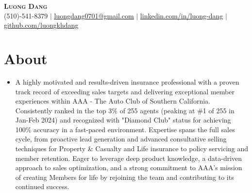 \documentclass[letterpaper,10pt]{article}
\begin{document}
\begin{center}
    \textbf{\Huge \scshape Luong Dang} \\ \vspace{1pt} %
    \small %
    (510)-541-8379 $|$
    \href{mailto:luongdang0701@gmail.com}{\underline{luongdang0701@gmail.com}} $|$
    \href{https://linkedin.com/in/luong-dang}{\underline{linkedin.com/in/luong-dang}} $|$
    \href{https://github.com/luongkhdang}{\underline{github.com/luongkhdang}}
\end{center}

\section{About}
\begin{itemize}[leftmargin=0.15in, label={}, topsep=0pt, partopsep=0pt, itemsep=0pt, parsep=0pt] %
    \item \small{\justifying %
A highly motivated and results-driven insurance professional with a proven track record of exceeding sales targets and delivering exceptional member experiences within AAA - The Auto Club of Southern California. Consistently ranked in the top 3\% of 255 agents (peaking at \#1 of 255 in Jan-Feb 2024) and recognized with "Diamond Club" status for achieving 100\% accuracy in a fast-paced environment. Expertise spans the full sales cycle, from proactive lead generation and advanced consultative selling techniques for Property \& Casualty and Life insurance to policy servicing and member retention. Eager to leverage deep product knowledge, a data-driven approach to sales optimization, and a strong commitment to AAA's mission of creating Members for life by rejoining the team and contributing to its continued success.
    } %
\end{itemize}
\vspace{-10pt} %

\end{document}
